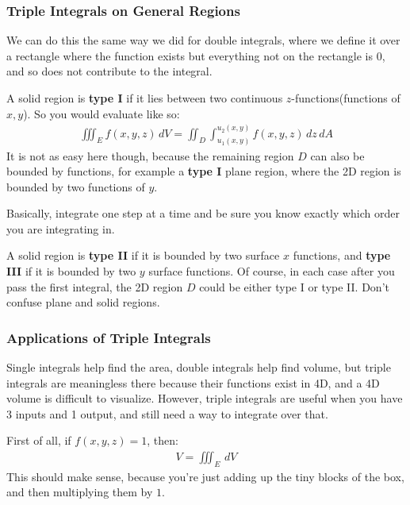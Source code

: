 \documentclass{article}
\begin{document}
\subsubsection{Triple Integrals on General Regions}
We can do this the same way we did for double integrals, where we define it over a rectangle where the function exists but everything not on the rectangle is $0$, and so does not contribute to the integral.

A solid region is \textbf{type I} if it lies between two continuous $z$-functions(functions of $x,y$). So you would evaluate like so:
\begin{gather*}
    \iiint_E f(x,y,z) \, dV = \iint_D \int_{u_1(x,y)}^{u_2(x,y)} f(x,y,z) \,dz \, dA
\end{gather*}
It is not as easy here though, because the remaining region $D$ can also be bounded by functions, for example a \textbf{type I} plane region, where the 2D region is bounded by two functions of $y$.

Basically, integrate one step at a time and be sure you know exactly which order you are integrating in.

A solid region is \textbf{type II} if it is bounded by two surface $x$ functions, and \textbf{type III} if it is bounded by two $y$ surface functions. Of course, in each case after you pass the first integral, the 2D region $D$ could be either type I or type II. Don't confuse plane and solid regions.
\subsubsection{Applications of Triple Integrals}
Single integrals help find the area, double integrals help find volume, but triple integrals are meaningless there because their functions exist in 4D, and a 4D volume is difficult to visualize. However, triple integrals are useful when you have 3 inputs and 1 output, and still need a way to integrate over that.

First of all, if $f(x,y,z) = 1$, then:
\begin{gather*}
    V = \iiint_E \, dV
\end{gather*}
This should make sense, because you're just adding up the tiny blocks of the box, and then multiplying them by $1$.
\end{document}
